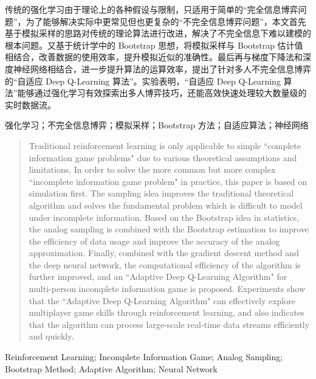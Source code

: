 

\begin{zhaiyao}

传统的强化学习由于理论上的各种假设与限制，只适用于简单的“完全信息博弈问题”，为了能够解决实际中更常见但也更复杂的“不完全信息博弈问题”，本文首先基于模拟采样的思路对传统的理论算法进行改进，解决了不完全信息下难以建模的根本问题。又基于统计学中的 Bootstrap 思想，将模拟采样与 Bootstrap 估计值相结合，改善数据的使用效率，提升模拟近似的准确性。最后再与梯度下降法和深度神经网络相结合，进一步提升算法的运算效率，提出了针对多人不完全信息博弈的“自适应 Deep Q-Learning 算法”。实验表明，“自适应 Deep Q-Learning 算法”能够通过强化学习有效探索出多人博弈技巧，还能高效快速处理较大数量级的实时数据流。

\end{zhaiyao}

\begin{guanjianci}
强化学习；不完全信息博弈；模拟采样；Bootstrap 方法；自适应算法；神经网络
\end{guanjianci}

\begin{abstract}

Traditional reinforcement learning is only applicable to simple ``complete information game problems" due to various theoretical assumptions and limitations. In order to solve the more common but more complex ``incomplete information game problem" in practice, this paper is based on simulation first. The sampling idea improves the traditional theoretical algorithm and solves the fundamental problem which is difficult to model under incomplete information. Based on the Bootstrap idea in statistics, the analog sampling is combined with the Bootstrap estimation to improve the efficiency of data usage and improve the accuracy of the analog approximation. Finally, combined with the gradient descent method and the deep neural network, the computational efficiency of the algorithm is further improved, and an ``Adaptive Deep Q-Learning Algorithm" for multi-person incomplete information game is proposed. Experiments show that the ``Adaptive Deep Q-Learning Algorithm" can effectively explore multiplayer game skills through reinforcement learning, and also indicates that the algorithm can process large-scale real-time data streams efficiently and quickly.

\end{abstract}

\begin{keywords}
Reinforcement Learning; Incomplete Information Game; Analog Sampling; Bootstrap Method; Adaptive Algorithm; Neural Network
\end{keywords}
